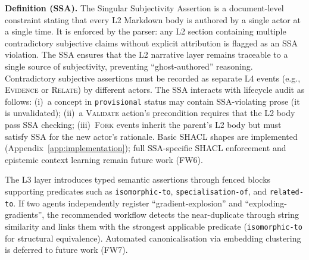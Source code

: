 \textbf{Definition (SSA).} The Singular Subjectivity Assertion is a document-level constraint stating that every L2 Markdown body is authored by a single actor at a single time. It is enforced by the parser: any L2 section containing multiple contradictory subjective claims without explicit attribution is flagged as an SSA violation. The SSA ensures that the L2 narrative layer remains traceable to a single source of subjectivity, preventing ``ghost-authored'' reasoning. Contradictory subjective assertions must be recorded as separate L4 events (e.g., \textsc{Evidence} or \textsc{Relate}) by different actors. The SSA interacts with lifecycle audit as follows: (i)~a concept in \texttt{provisional} status may contain SSA-violating prose (it is unvalidated); (ii)~a \textsc{Validate} action's precondition requires that the L2 body pass SSA checking; (iii)~\textsc{Fork} events inherit the parent's L2 body but must satisfy SSA for the new actor's rationale. Basic SHACL shapes are implemented (Appendix~\ref{app:implementation}); full SSA-specific SHACL enforcement and epistemic context learning remain future work (FW6).

The L3 layer introduces typed semantic assertions through fenced blocks supporting predicates such as \texttt{isomorphic-to}, \texttt{specialisation-of}, and \texttt{related-to}. If two agents independently register ``gradient-explosion'' and ``exploding-gradients'', the recommended workflow detects the near-duplicate through string similarity and links them with the strongest applicable predicate (\texttt{isomorphic-to} for structural equivalence). Automated canonicalisation via embedding clustering is deferred to future work (FW7).

